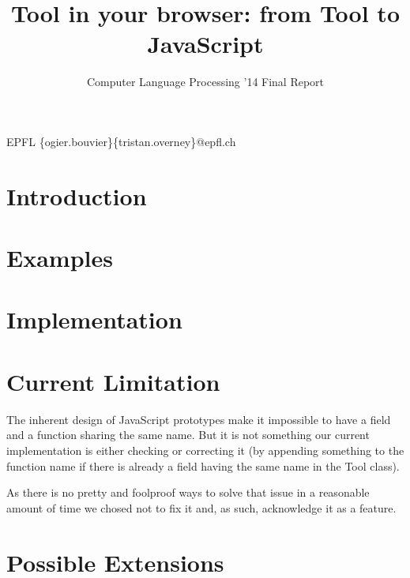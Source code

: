 \documentclass[nocopyrightspace,11pt,authoryear,preprint]{sigplanconf}
\begin{document}


\title{Tool in your browser: from Tool to JavaScript}
\subtitle{Computer Language Processing '14 Final Report}

           {EPFL}
           {\{ogier.bouvier\}\{tristan.overney\}@epfl.ch}

\maketitle

\section{Introduction}


\section{Examples}


\section{Implementation}


\section{Current Limitation}
The inherent design of JavaScript prototypes make it impossible to have a field and a function sharing the same name. But it is not something our current implementation is either checking or correcting it (by appending something to the function name if there is already a field having the same name in the Tool class).

As there is no pretty and foolproof ways to solve that issue in a reasonable amount of time we chosed not to fix it and, as such, acknowledge it as a feature.

\section{Possible Extensions}




\end{document}

